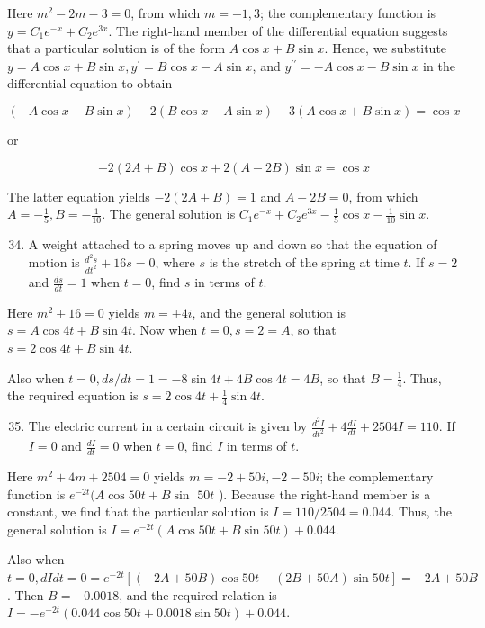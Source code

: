 \documentclass[10pt]{article}
\begin{document}
Here $m^{2}-2 m-3=0$, from which $m=-1,3$; the complementary function is $y=C_{1} e^{-x}+C_{2} e^{3 x}$. The right-hand member of the differential equation suggests that a particular solution is of the form $A \cos x+B \sin x$. Hence, we substitute $y=A \cos x+B \sin x, y^{\prime}=B \cos x-A \sin x$, and $y^{\prime \prime}=-A \cos x-B \sin x$ in the differential equation to obtain

$$
(-A \cos x-B \sin x)-2(B \cos x-A \sin x)-3(A \cos x+B \sin x)=\cos x
$$

or

$$
-2(2 A+B) \cos x+2(A-2 B) \sin x=\cos x
$$

The latter equation yields $-2(2 A+B)=1$ and $A-2 B=0$, from which $A=-\frac{1}{5}, B=-\frac{1}{10}$. The general solution is $C_{1} e^{-x}+C_{2} e^{3 x}-\frac{1}{5} \cos x-\frac{1}{10} \sin x$.

\begin{enumerate}
  \setcounter{enumi}{33}
  \item A weight attached to a spring moves up and down so that the equation of motion is $\frac{d^{2} s}{d t^{2}}+16 s=0$, where $s$ is the stretch of the spring at time $t$. If $s=2$ and $\frac{d s}{d t}=1$ when $t=0$, find $s$ in terms of $t$.
\end{enumerate}

Here $m^{2}+16=0$ yields $m= \pm 4 i$, and the general solution is $s=A \cos 4 t+B \sin 4 t$. Now when $t=0, s=2=A$, so that $s=2 \cos 4 t+B \sin 4 t$.

Also when $t=0, d s / d t=1=-8 \sin 4 t+4 B \cos 4 t=4 B$, so that $B=\frac{1}{4}$. Thus, the required equation is $s=2 \cos 4 t+\frac{1}{4} \sin 4 t$.

\begin{enumerate}
  \setcounter{enumi}{34}
  \item The electric current in a certain circuit is given by $\frac{d^{2} I}{d t^{2}}+4 \frac{d I}{d t}+2504 I=110$. If $I=0$ and $\frac{d I}{d t}=0$ when $t=0$, find $I$ in terms of $t$.
\end{enumerate}

Here $m^{2}+4 m+2504=0$ yields $m=-2+50 i,-2-50 i$; the complementary function is $e^{-2 t}(A \cos 50 t+B \sin$ $50 t$ ). Because the right-hand member is a constant, we find that the particular solution is $I=110 / 2504=0.044$. Thus, the general solution is $I=e^{-2 t}(A \cos 50 t+B \sin 50 t)+0.044$.

Also when $t=0, d I d t=0=e^{-2 t}[(-2 A+50 B) \cos 50 t-(2 B+50 A) \sin 50 t]=-2 A+50 B$. Then $B=-0.0018$, and the required relation is $I=-e^{-2 t}(0.044 \cos 50 t+0.0018 \sin 50 t)+0.044$.
\end{document}
